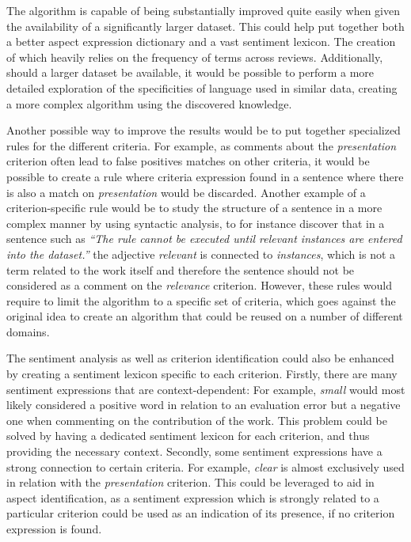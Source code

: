 The algorithm is capable of being substantially improved quite easily when given the availability of a significantly larger dataset. This could help put together both a better aspect expression dictionary and a vast sentiment lexicon. The creation of which heavily relies on the frequency of terms across reviews. Additionally, should a larger dataset be available, it would be possible to perform a more detailed exploration of the specificities of language used in similar data, creating a more complex algorithm using the discovered knowledge. 

Another possible way to improve the results would be to put together specialized rules for the different criteria. For example, as comments about the \textit{presentation} criterion often lead to false positives matches on other criteria, it would be possible to  create a rule where criteria expression found in a sentence where there is also a match on \textit{presentation} would be discarded. Another example of a criterion-specific rule would be to study the structure of a sentence in a more complex manner by using syntactic analysis, to for instance discover that in a sentence such as \textit{``The rule  cannot be executed until relevant instances are entered into the dataset.''} the adjective \textit{relevant} is connected to \textit{instances}, which is not a term related to the work itself and therefore the sentence should not be considered as a comment on the \textit{relevance} criterion. However, these rules would require to limit the algorithm to a specific set of criteria, which goes against the original idea to create an algorithm that could be reused on a number of different domains.

The sentiment analysis as well as criterion identification could also be enhanced by creating a sentiment lexicon specific to each criterion. Firstly, there are many sentiment expressions that are context-dependent: For example, \textit{small} would most likely considered a positive word in relation to an evaluation error but a negative one when commenting on the contribution of the work. This problem could be solved by having a dedicated sentiment lexicon for each criterion, and thus providing the necessary context. Secondly, some sentiment expressions have a strong connection to certain criteria. For example, \textit{clear} is almost exclusively used in relation with the \textit{presentation} criterion. This could be leveraged to aid in aspect identification, as a sentiment expression which is strongly related to a particular criterion could be used as an indication of its presence, if no criterion expression is found. 




